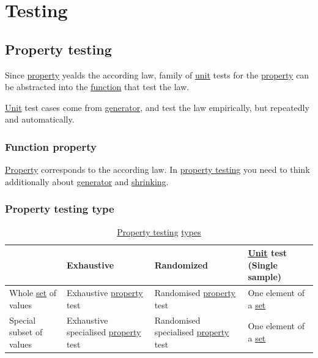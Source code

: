 \documentclass[a4paper,14pt,oneside]{book}
\begin{document}
\chapter{\label{org95c38d3}Testing}
\label{sec:orgc549d11}
\section{\label{org9b836a7}Property testing}
\label{sec:org57226df}

Since \hyperref[org61434c5]{property} yealds the according law, family of \hyperref[org38df1b1]{unit} tests for the \hyperref[org61434c5]{property} can be abstracted into the \hyperref[org0587972]{function} that test the law.

\hyperref[org38df1b1]{Unit} test cases come from \hyperref[orgd20059b]{generator}, and test the law empirically, but repeatedly and automatically.

\subsection{\label{orgee43700}Function property}
\label{sec:org225ee41}

\hyperref[org61434c5]{Property} corresponds to the according law.
In \hyperref[org9b836a7]{property testing} you need to think additionally about \hyperref[orgd20059b]{generator} and \hyperref[orgbbdc5b2]{shrinking}.

\subsection{\label{org6e6734b}Property testing type}
\label{sec:orgd37e6f9}

\begin{table}[htbp]
\caption{\label{tab--property-testing-type}\hyperref[org9b836a7]{Property testing} \hyperref[orgafd8fcb]{types}}
\centering
\begin{tabu} spread \linewidth {llll}
\toprule
 & Exhaustive & Randomized & \hyperref[org38df1b1]{Unit} test (Single sample)\\
\midrule
Whole \hyperref[org0d04814]{set} of values & Exhaustive \hyperref[org61434c5]{property} test & Randomised \hyperref[org61434c5]{property} test & One element of a \hyperref[org0d04814]{set}\\
Special subset of values & Exhaustive specialised \hyperref[org61434c5]{property} test & Randomised specialised \hyperref[org61434c5]{property} test & One element of a \hyperref[org0d04814]{set}\\
\bottomrule
\end{tabu}
\end{table}
\end{document}
